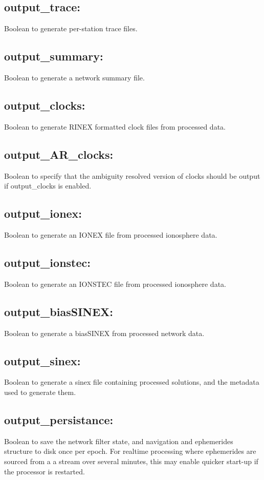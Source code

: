\subsection*{output\_trace:}
Boolean to generate per-station trace files.

\subsection*{output\_summary:}
Boolean to generate a network summary file.

\subsection*{output\_clocks:}
Boolean to generate RINEX formatted clock files from processed data.

\subsection*{output\_AR\_clocks:}
Boolean to specify that the ambiguity resolved version of clocks should be output if output\_clocks is enabled.

\subsection*{output\_ionex:}
Boolean to generate an IONEX file from processed ionosphere data.

\subsection*{output\_ionstec:}
Boolean to generate an IONSTEC file from processed ionosphere data.

\subsection*{output\_biasSINEX:}
Boolean to generate a biasSINEX from processed network data.

\subsection*{output\_sinex:}
Boolean to generate a sinex file containing processed solutions, and the metadata used to generate them.

\subsection*{output\_persistance:}
Boolean to save the network filter state, and navigation and ephemerides structure to disk once per epoch. For realtime processing where ephemerides are sourced from a a stream over several minutes, this may enable quicker start-up if the processor is restarted.

